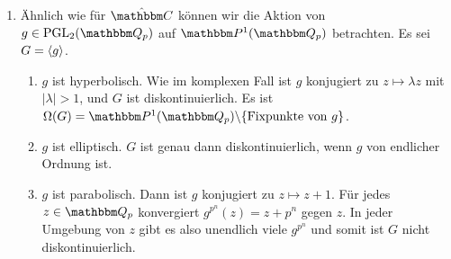 \documentclass[a4paper, 12pt, twoside]{article}
\begin{document}
\begin{enumerate}
\item Ähnlich wie für $\hat{\CC}$ können wir die Aktion von
$g\in\PGL_2(\QQ_p)$ auf $\PP^1(\QQ_p)$ betrachten.
Es sei $G=\langle g\rangle$.
\begin{enumerate}
\item $g$ ist hyperbolisch. Wie im komplexen Fall ist $g$ konjugiert
zu $z\mapsto\lambda z$ mit $|\lambda|>1$, und $G$ ist diskontinuierlich.
Es ist $\Omega(G)=\PP^1(\QQ_p)\backslash\{\text{Fixpunkte von }g\}$.
\item $g$ ist elliptisch. $G$ ist genau dann diskontinuierlich, wenn
$g$ von endlicher Ordnung ist.
\item $g$ ist parabolisch. Dann ist $g$ konjugiert zu $z\mapsto z+1$.
Für jedes $z\in\QQ_p$ konvergiert $g^{p^n}(z)=z+p^n$ gegen $z$.
In jeder Umgebung von $z$ gibt es also unendlich viele $g^{p^n}$
und somit ist $G$ nicht diskontinuierlich.
\end{enumerate}
\end{enumerate}
\end{document}
